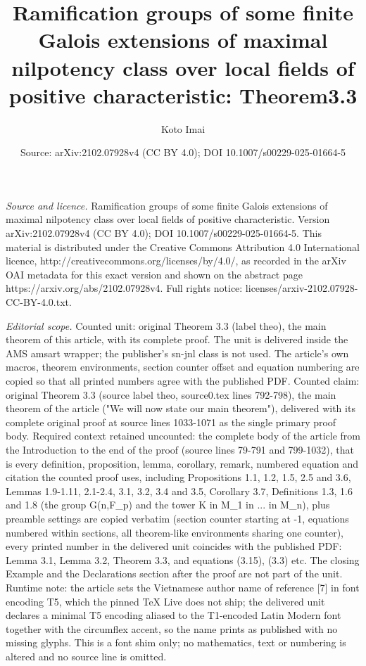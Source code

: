 \documentclass[10pt,a4paper]{amsart}
\title[Upper ramification jumps of a totally ramified Galois extens]{Ramification groups of some finite Galois extensions of maximal nilpotency class over local fields of positive characteristic: Theorem3.3}
\author{Koto Imai}
\date{Source: arXiv:2102.07928v4 (CC BY 4.0); DOI 10.1007/s00229-025-01664-5}
\numberwithin{equation}{section}
\theoremstyle{plain}
\theoremstyle{definition}
\begin{document}
\maketitle
\noindent\emph{Source and licence.} Ramification groups of some finite Galois extensions of maximal nilpotency class over local fields of positive characteristic. Version arXiv:2102.07928v4 (CC BY 4.0); DOI 10.1007/s00229-025-01664-5. This material is distributed under the Creative Commons Attribution 4.0 International licence, http://creativecommons.org/licenses/by/4.0/, as recorded in the arXiv OAI metadata for this exact version and shown on the abstract page https://arxiv.org/abs/2102.07928v4. Full rights notice: licenses/arxiv-2102.07928-CC-BY-4.0.txt.\par\smallskip
\noindent\textit{Editorial scope.} Counted unit: original Theorem 3.3 (label theo), the main theorem of this article, with its complete proof. The unit is delivered inside the AMS amsart wrapper; the publisher's sn-jnl class is not used. The article's own macros, theorem environments, section counter offset and equation numbering are copied so that all printed numbers agree with the published PDF. Counted claim: original Theorem 3.3 (source label theo, source0.tex lines 792-798), the main theorem of the article ("We will now state our main theorem"), delivered with its complete original proof at source lines 1033-1071 as the single primary proof body. Required context retained uncounted: the complete body of the article from the Introduction to the end of the proof (source lines 79-791 and 799-1032), that is every definition, proposition, lemma, corollary, remark, numbered equation and citation the counted proof uses, including Propositions 1.1, 1.2, 1.5, 2.5 and 3.6, Lemmas 1.9-1.11, 2.1-2.4, 3.1, 3.2, 3.4 and 3.5, Corollary 3.7, Definitions 1.3, 1.6 and 1.8 (the group G(n,F\_p) and the tower K in M\_1 in ... in M\_n), plus preamble settings are copied verbatim (section counter starting at -1, equations numbered within sections, all theorem-like environments sharing one counter), every printed number in the delivered unit coincides with the published PDF: Lemma 3.1, Lemma 3.2, Theorem 3.3, and equations (3.15), (3.3) etc. The closing Example and the Declarations section after the proof are not part of the unit. Runtime note: the article sets the Vietnamese author name of reference [7] in font encoding T5, which the pinned TeX Live does not ship; the delivered unit declares a minimal T5 encoding aliased to the T1-encoded Latin Modern font together with the circumflex accent, so the name prints as published with no missing glyphs. This is a font shim only; no mathematics, text or numbering is altered and no source line is omitted.
\end{document}
